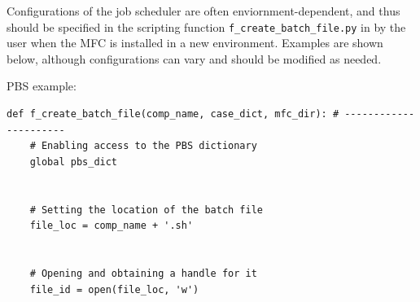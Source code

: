 \documentclass[11pt]{article}
\begin{document}
Configurations of the job scheduler are often enviornment-dependent, and thus should be specified in the scripting function \texttt{f_create_batch_file.py} in by the user when the MFC is installed in a new environment.
Examples are shown below, although configurations can vary and should be modified as needed.

PBS example: \\
\begin{lstlisting}[style=BashInputStyle]
def f_create_batch_file(comp_name, case_dict, mfc_dir): # ----------------------
    # Enabling access to the PBS dictionary
    global pbs_dict
    
    
    # Setting the location of the batch file
    file_loc = comp_name + '.sh'
    
    
    # Opening and obtaining a handle for it
    file_id = open(file_loc, 'w')
    

\end{lstlisting}
\end{document}
